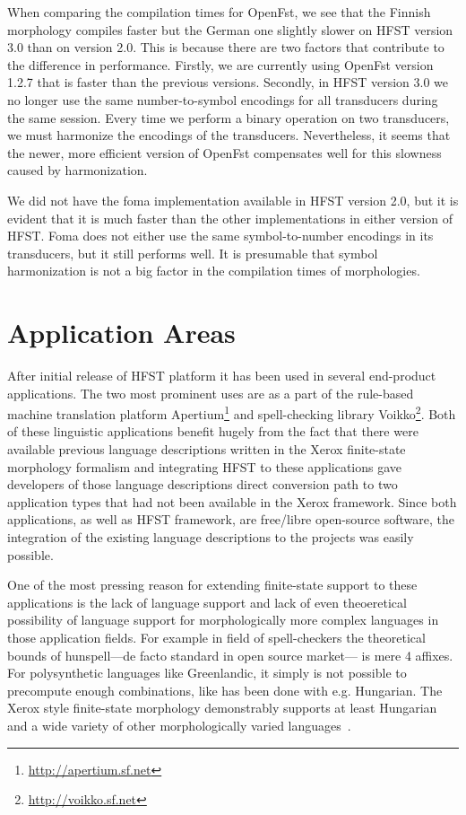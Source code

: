 \documentclass{llncs}
\begin{document}
When comparing the compilation times for OpenFst, we see that the
Finnish morphology compiles faster but the German one slightly slower
on HFST version 3.0 than on version 2.0. This is because there are two
factors that contribute to the difference in performance. Firstly, we
are currently using OpenFst version 1.2.7 that is faster than the
previous versions. Secondly, in HFST version 3.0 we no longer use the
same number-to-symbol encodings for all transducers during the same
session. Every time we perform a binary operation on two transducers,
we must harmonize the encodings of the transducers. Nevertheless, 
it seems that the newer, more efficient version of
OpenFst compensates well for this slowness caused by harmonization. 

We did not have the foma implementation available in HFST version 2.0,
but it is evident that it is much faster than the other
implementations in either version of HFST. Foma does not either use
the same symbol-to-number encodings in its transducers, but it still
performs well. It is presumable that symbol harmonization is not a big
factor in the compilation times of morphologies. 


\section{Application Areas}

After initial release of HFST platform it has been used in several end-product
applications. The two most prominent uses are as a part of the rule-based
machine translation platform Apertium\footnote{\url{http://apertium.sf.net}}
and spell-checking library Voikko\footnote{\url{http://voikko.sf.net}}. Both of
these linguistic applications benefit hugely from the fact that there
were available previous language descriptions written in the Xerox finite-state
morphology formalism and integrating HFST to these applications gave
developers of those language descriptions direct conversion path to two
application types that had not been available in the Xerox framework. Since
both applications, as well as HFST framework, are free/libre open-source
software, the integration of the existing language descriptions to the
projects was easily possible.

One of the most pressing reason for extending finite-state support to these
applications is the lack of language support and lack of even theoeretical
possibility of language support for morphologically more complex languages
in those application fields. For example in field of spell-checkers the
theoretical bounds of hunspell---de facto standard in open source market---
is mere 4 affixes. For polysynthetic languages like Greenlandic, it simply is
not possible to precompute enough combinations, like has been done with
e.g. Hungarian. The Xerox style finite-state morphology demonstrably supports
at least Hungarian and a wide variety of other morphologically varied
languages~\cite{beesley/2003}.
\end{document}
